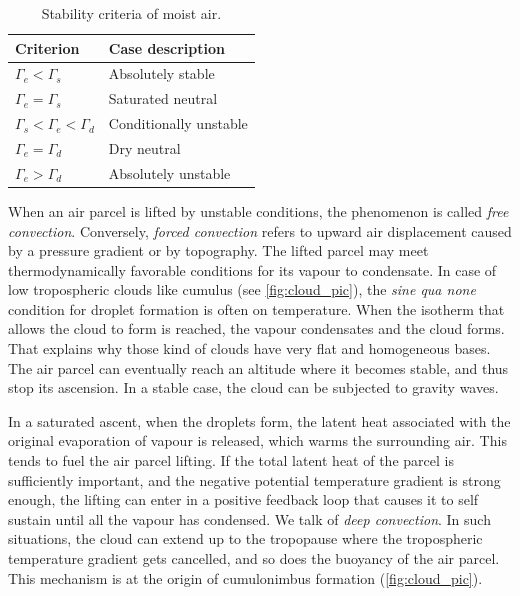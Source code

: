     \begin{table}[h]
        \centering
        \caption{Stability criteria of moist air.}
        \begin{tabular}{l|l}
            \toprule
            \textbf{Criterion} & \textbf{Case description}\\
            \midrule
            $\Gamma_e < \Gamma_s$ & Absolutely stable \\
            $\Gamma_e = \Gamma_s$ & Saturated neutral\\
            $\Gamma_s < \Gamma_e < \Gamma_d$ & Conditionally unstable\\
            $\Gamma_e = \Gamma_d$ & Dry neutral\\
            $\Gamma_e > \Gamma_d$ & Absolutely unstable \\
            \bottomrule
        \end{tabular}
        \label{tab:stability_conditions}
    \end{table}

    When an air parcel is lifted by unstable conditions, the phenomenon is called \textit{free convection}. Conversely, \textit{forced convection} refers to upward air displacement caused by a pressure gradient or by topography.
    The lifted parcel may meet thermodynamically favorable conditions for its vapour to condensate. 
    In case of low tropospheric clouds like cumulus (see \cref{fig:cloud_pic}), the \textit{sine qua none} condition for droplet formation is often on temperature. When the isotherm that allows the cloud to form is reached, the vapour condensates and the cloud forms. That explains why those kind of clouds have very flat and homogeneous bases.
    The air parcel can eventually reach an altitude where it becomes stable, and thus stop its ascension. 
    In a stable case, the cloud can be subjected to gravity waves. %
     
    In a saturated ascent, when the droplets form, the latent heat associated with the original evaporation of vapour is released, which warms the surrounding air. This tends to fuel the air parcel lifting. If the total latent heat of the parcel is sufficiently important, and the negative potential temperature gradient is strong enough, the lifting can enter in a positive feedback loop that causes it to self sustain until all the vapour has condensed. We talk of \textit{deep convection}.
    In such situations, the cloud can extend up to the tropopause where the tropospheric temperature gradient gets cancelled, and so does the buoyancy of the air parcel. 
    This mechanism is at the origin of cumulonimbus formation (\cref{fig:cloud_pic}).


